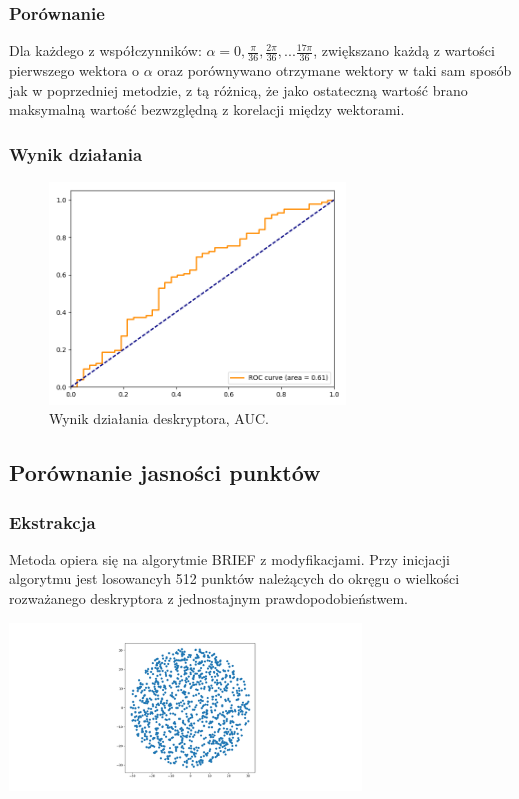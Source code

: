 \documentclass[a4paper,11pt]{article}
\begin{document}
\subsubsection{Porównanie}
Dla każdego z współczynników: $\alpha = 0, \frac{\pi}{36}, \frac{2\pi}{36},...\frac{17\pi}{36}$, zwiększano każdą z wartości pierwszego wektora o $\alpha$ oraz porównywano otrzymane wektory w taki sam sposób jak w poprzedniej metodzie, z tą różnicą, że jako ostateczną wartość brano maksymalną wartość bezwzględną z korelacji między wektorami.


\subsubsection{Wynik działania}

\begin{figure}[H]
\begin{center}
\includegraphics[width=0.7\textwidth]{./img/max_on_circle.png}
\end{center}
\caption{Wynik działania deskryptora, AUC.}
\end{figure}


\subsection{Porównanie jasności punktów}
\subsubsection{Ekstrakcja}
Metoda opiera się na algorytmie BRIEF z modyfikacjami. Przy inicjacji algorytmu jest losowancyh 512 punktów należących do okręgu o wielkości rozważanego deskryptora z jednostajnym prawdopodobieństwem.

\includegraphics[width=0.7\textwidth]{./img/points.png}
\end{document}
